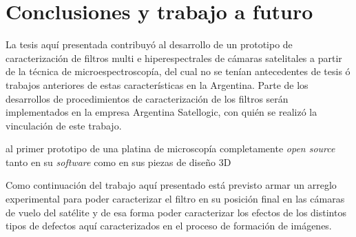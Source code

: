 \singlespacing
\chapter{Conclusiones y trabajo a futuro}
\label{chap:concls}

\hspace{0.5cm}La tesis aquí presentada contribuyó al desarrollo de un prototipo de caracterización de filtros multi e hiperespectrales de cámaras satelitales a partir de la técnica de microespectroscopía, del cual no se tenían antecedentes de tesis ó trabajos anteriores de estas características en la Argentina. Parte de los desarrollos de procedimientos de caracterización de los filtros serán implementados en la empresa Argentina Satellogic, con quién se realizó la vinculación de este trabajo.






 

al primer prototipo de una platina de microscopía completamente \textit{open source} tanto en su \textit{software} como en sus piezas de diseño 3D



Como continuación del trabajo aquí presentado está previsto armar un arreglo experimental para poder caracterizar el filtro en su posición final en las cámaras de vuelo del satélite y de esa forma poder caracterizar los efectos de los distintos tipos de defectos aquí caracterizados en el proceso de formación de imágenes.